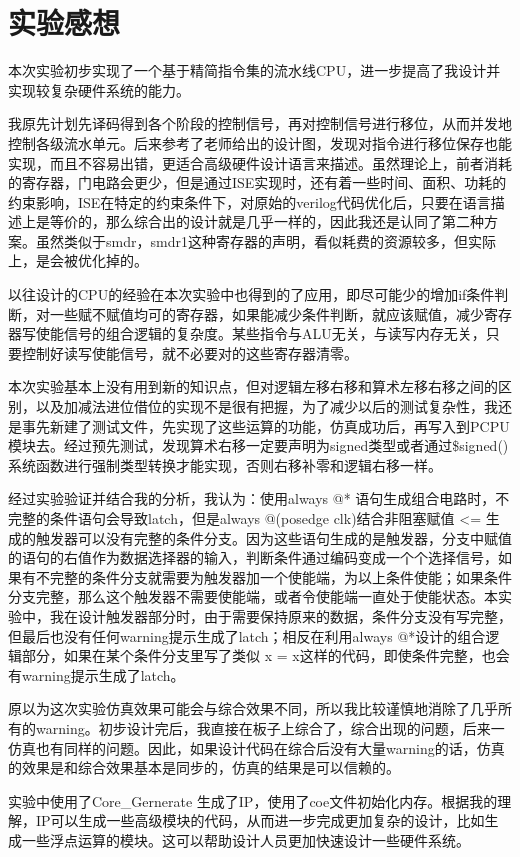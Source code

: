 \documentclass[10pt,a4paper,fleqn]{article}
\newcommand{\song}{\CJKfamily{song}}
\begin{document}
 \section{实验感想}
   \setlength{\parskip}{0.5\baselineskip}
   \par 本次实验初步实现了一个基于精简指令集的流水线CPU，进一步提高了我设计并实现较复杂硬件系统的能力。
   \par 我原先计划先译码得到各个阶段的控制信号，再对控制信号进行移位，从而并发地控制各级流水单元。后来参考了老师给出的设计图，发现对指令进行移位保存也能实现，而且不容易出错，更适合高级硬件设计语言来描述。虽然理论上，前者消耗的寄存器，门电路会更少，但是通过ISE实现时，还有着一些时间、面积、功耗的约束影响，ISE在特定的约束条件下，对原始的verilog代码优化后，只要在语言描述上是等价的，那么综合出的设计就是几乎一样的，因此我还是认同了第二种方案。虽然类似于smdr，smdr1这种寄存器的声明，看似耗费的资源较多，但实际上，是会被优化掉的。
   \par 以往设计的CPU的经验在本次实验中也得到的了应用，即尽可能少的增加if条件判断，对一些赋不赋值均可的寄存器，如果能减少条件判断，就应该赋值，减少寄存器写使能信号的组合逻辑的复杂度。某些指令与ALU无关，与读写内存无关，只要控制好读写使能信号，就不必要对的这些寄存器清零。
   \par 本次实验基本上没有用到新的知识点，但对逻辑左移右移和算术左移右移之间的区别，以及加减法进位借位的实现不是很有把握，为了减少以后的测试复杂性，我还是事先新建了测试文件，先实现了这些运算的功能，仿真成功后，再写入到PCPU模块去。经过预先测试，发现算术右移一定要声明为signed类型或者通过\$signed()系统函数进行强制类型转换才能实现，否则右移补零和逻辑右移一样。
   \par 经过实验验证并结合我的分析，我认为：使用always @* 语句生成组合电路时，不完整的条件语句会导致latch，但是always @(posedge clk)结合非阻塞赋值 <= 生成的触发器可以没有完整的条件分支。因为这些语句生成的是触发器，分支中赋值的语句的右值作为数据选择器的输入，判断条件通过编码变成一个个选择信号，如果有不完整的条件分支就需要为触发器加一个使能端，为以上条件使能；如果条件分支完整，那么这个触发器不需要使能端，或者令使能端一直处于使能状态。本实验中，我在设计触发器部分时，由于需要保持原来的数据，条件分支没有写完整，但最后也没有任何warning提示生成了latch；相反在利用always @*设计的组合逻辑部分，如果在某个条件分支里写了类似 x = x这样的代码，即使条件完整，也会有warning提示生成了latch。
   \par 原以为这次实验仿真效果可能会与综合效果不同，所以我比较谨慎地消除了几乎所有的warning。初步设计完后，我直接在板子上综合了，综合出现的问题，后来一仿真也有同样的问题。因此，如果设计代码在综合后没有大量warning的话，仿真的效果是和综合效果基本是同步的，仿真的结果是可以信赖的。
   \par 实验中使用了Core\_Gernerate 生成了IP，使用了coe文件初始化内存。根据我的理解，IP可以生成一些高级模块的代码，从而进一步完成更加复杂的设计，比如生成一些浮点运算的模块。这可以帮助设计人员更加快速设计一些硬件系统。
  \appendix
  \titleformat{\section}{\bf\song}{\thesection}{1em}{}
  \newpage
\end{document}
